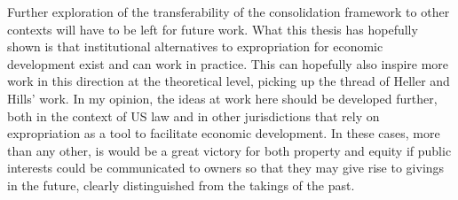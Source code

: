 Further exploration of the transferability of the consolidation framework to other contexts will have to be left for future work. What this thesis has hopefully shown is that institutional alternatives to expropriation for economic development exist and can work in practice. This can hopefully also inspire more work in this direction at the theoretical level, picking up the thread of Heller and Hills' work. In my opinion, the ideas at work here should be developed further, both in the context of US law and in other jurisdictions that rely on expropriation as a tool to facilitate economic development. In these cases, more than any other, is would be a great victory for both property and equity if public interests could be communicated to owners so that they may give rise to givings in the future, clearly distinguished from the takings of the past.